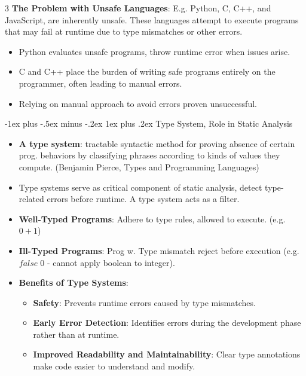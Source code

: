 \documentclass[a4paper, 10pt, landscape]{article}
\makeatletter
\renewcommand{\subsubsection}{\@startsection{subsubsection}{3}{0mm}%
                                {-1ex plus -.5ex minus -.2ex}%
                                {1ex plus .2ex}%
                                {\normalfont\small\bfseries}}
\makeatother
\begin{document}
\begin{multicols*}{3}
\textbf{The Problem with Unsafe Languages}: E.g. Python, C, C++, and JavaScript, are inherently unsafe. These languages attempt to execute programs that may fail at runtime due to type mismatches or other errors.
\begin{itemize}
\item Python evaluates unsafe programs, throw runtime error when issues arise.
\item C and C++ place the burden of writing safe programs entirely on the programmer, often leading to manual errors.
\item Relying on manual approach to avoid errors proven unsuccessful.
\end{itemize}


\subsubsection{Type System, Role in Static Analysis}
\begin{itemize}
\item \textbf{A type system}: tractable syntactic method for proving absence of certain prog. behaviors by classifying phrases according to kinds of values they compute. (Benjamin Pierce, Types and Programming Languages)
\item Type systems serve as critical component of static analysis, detect type-related errors before runtime. A type system acts as a filter.
\item\textbf{Well-Typed Programs}: Adhere to type rules, allowed to execute. (e.g. $0 + 1$)
\item \textbf{Ill-Typed Programs}: Prog w. Type mismatch reject before execution (e.g. $false \; 0$ - cannot apply boolean to integer).
\item \textbf{Benefits of Type Systems}: 
	\begin{itemize}
	\item \textbf{Safety}: Prevents runtime errors caused by type mismatches.
	\item \textbf{Early Error Detection}: Identifies errors during the development phase rather than at runtime.
	\item \textbf{Improved Readability and Maintainability}: Clear type annotations make code easier to understand and modify.
	\end{itemize}
\end{itemize}


\end{multicols*}
\end{document}
